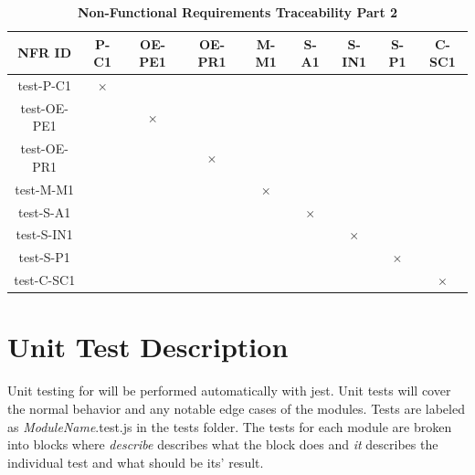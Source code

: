 \documentclass[12pt, titlepage]{article}
\begin{document}
\begin{table}[H]
\centering
\begin{tabular}{|c|c|c|c|c|c|c|c|c|}
\hline
NFR ID & P-C1 & OE-PE1 & OE-PR1 & M-M1 & S-A1 & S-IN1 & S-P1 & C-SC1 \\
\hline 
test-P-C1 & $\times$ & & & & & & &   \\
test-OE-PE1 &  & $\times$  & & & & & &   \\
test-OE-PR1 &  &  & $\times$  & & & & &   \\
test-M-M1 &  & & & $\times$  & & & &   \\
test-S-A1 &  &  & & & $\times$   & & &   \\
test-S-IN1 &  &  & & &    & $\times$ & &   \\
test-S-P1 &  &  & & &    &  & $\times$ &   \\
test-C-SC1 &  &  & & &    &  &  & $\times$  \\
\hline
\end{tabular}
\caption{\bf Non-Functional Requirements Traceability Part 2}
\end{table}

\section{Unit Test Description}

Unit testing for \progname{} will be performed automatically with jest. Unit tests will cover the normal behavior and any notable edge cases of the modules. Tests are labeled as \textit{ModuleName}.test.js in the tests folder. The tests for each module are broken into blocks where \textit{describe} describes what the block does and \textit{it} describes the individual test and what should be its' result.



\end{document}
